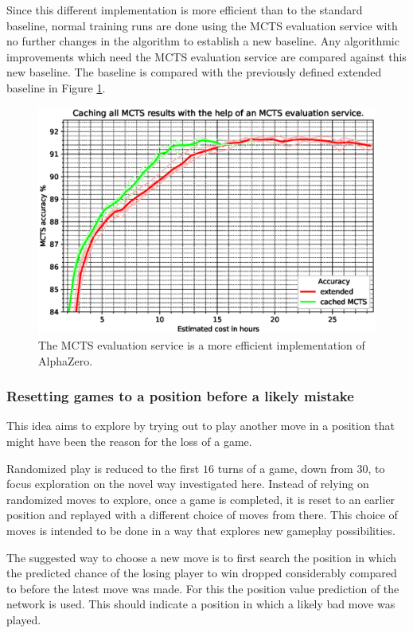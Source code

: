 \documentclass[12pt,onecolumn,oneside,titlepage]{article}
\begin{document}
Since this different implementation is more efficient than to the standard baseline, normal training runs are done using the MCTS evaluation 
service with no further changes in the algorithm to establish a new baseline.
Any algorithmic improvements which need the MCTS evaluation service are compared against this new baseline. The baseline is compared with the previously defined extended baseline in Figure \ref{fig:cache_play}.

\begin{figure}[H]
\centering
\includegraphics[clip,width=\columnwidth]{cache_play}
\caption{The MCTS evaluation service is a more efficient implementation of AlphaZero.}
\label{fig:cache_play}
\end{figure}




\subsubsection{Resetting games to a position before a likely mistake}

This idea aims to explore by trying out to play another move in a position that might have been the reason for the loss of a game.

Randomized play is reduced to the first $16$ turns of a game, down from $30$, to focus exploration on the novel way investigated here.
Instead of relying on randomized moves to explore, once a game is completed,
it is reset to an earlier position and replayed with a different choice of moves from there.
This choice of moves is intended to be done in a way that explores new gameplay possibilities.

The suggested way to choose a new move is to first search the position in which the predicted
chance of the losing player to win dropped considerably compared to before the latest move was made. For this the position value prediction of the network is used.
This should indicate a position in which a likely bad move was played.
\end{document}
